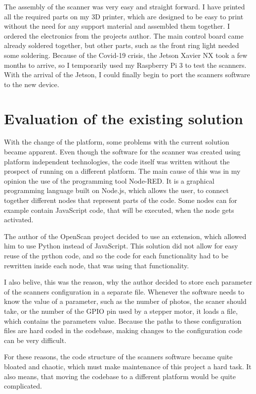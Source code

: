 The assembly of the scanner was very easy and straight forward.
I have printed all the required parts on my 3D printer, which are designed to be easy to print without the need for any support material and assembled them together.
I ordered the electronics from the projects author. The main control board came already soldered together, but other parts, such as the front ring light needed some soldering.
Because of the Covid-19 crisis, the Jetson Xavier NX took a few months to arrive, so I temporarily used my Raspberry Pi 3 to test the scanners.
With the arrival of the Jetson, I could finally begin to port the scanners software to the new device.


\section{Evaluation of the existing solution}
With the change of the platform, some problems with the current solution became apparent.
Even though the software for the scanner was created using platform independent technologies, the code itself was written without the prospect of running on a different platform.
The main cause of this was in my opinion the use of the programming tool Node-RED.
It is a graphical programming language built on Node.js, which allows the user, to connect together different nodes that represent parts of the code. \cite{node-red}
Some nodes can for example contain JavaScript code, that will be executed, when the node gets activated.

The author of the OpenScan project decided to use an extension, which allowed him to use Python instead of JavaScript.
This solution did not allow for easy reuse of the python code, and so the code for each functionality had to be rewritten inside each node, that was using that functionality.

I also belive, this was the reason, why the author decided to store each parameter of the scanners configuration in a separate file.
Whenever the software needs to know the value of a parameter, such as the number of photos, the scaner should take, or the number of the GPIO pin used by a stepper motor, it loads a file, which contains the parameters value.
Because the paths to these configuration files are hard coded in the codebase, making changes to the configuration code can be very difficult.

For these reasons, the code structure of the scanners software became quite bloated and chaotic, which must make maintenance of this project a hard task.
It also means, that moving the codebase to a different platform would be quite complicated.


